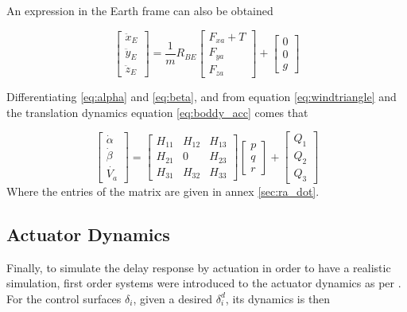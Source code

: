 An expression in the Earth frame can also be obtained

\begin{equation}
\begin{bmatrix}
\ddot{x}_E\\
\ddot{y}_E\\
\ddot{z}_E
\end{bmatrix}
= \dfrac{1}{m} R_{BE}
\begin{bmatrix}
F_{xa}+T\\
F_{ya}\\
F_{za}
\end{bmatrix}
+
\begin{bmatrix}
0\\
0\\
g
\end{bmatrix}
\end{equation}

Differentiating \ref{eq:alpha} and \ref{eq:beta}, and from equation \ref{eq:windtriangle} and the translation dynamics equation \ref{eq:boddy_acc} comes that 

\begin{equation}
\begin{bmatrix}
\dot{\alpha}\\
\dot{\beta}\\
\dot{V_a}
\end{bmatrix}
= 
\begin{bmatrix}
H_{11} & H_{12} & H_{13}\\
H_{21} & 0 & H_{23}\\
H_{31} & H_{32} & H_{33}
\end{bmatrix}
\begin{bmatrix}
p\\
q\\
r
\end{bmatrix}
+
\begin{bmatrix}
Q_1\\
Q_2\\
Q_3
\end{bmatrix}
\label{eq:alphabetadot}
\end{equation}
Where the entries of the matrix are given in annex \ref{sec:ra_dot}.

\subsection{Actuator Dynamics}

Finally, to simulate the delay response by actuation in order to have a realistic simulation, first order systems were introduced to the actuator dynamics as per \cite{hector}. For the control surfaces $\delta_i$, given a desired $\delta_i^d$, its dynamics is then

